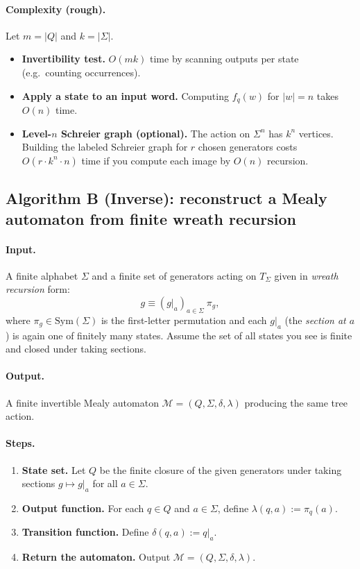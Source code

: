 \documentclass[11pt]{article}
\theoremstyle{definition}
\theoremstyle{plain}
\theoremstyle{remark}
\begin{document}
\paragraph{Complexity (rough).}
Let $m=|Q|$ and $k=|\Sigma|$.
\begin{itemize}[leftmargin=2em]
\item \textbf{Invertibility test.} $O(mk)$ time by scanning outputs per state (e.g.\ counting occurrences).
\item \textbf{Apply a state to an input word.} Computing $f_q(w)$ for $|w|=n$ takes $O(n)$ time.
\item \textbf{Level-$n$ Schreier graph (optional).} The action on $\Sigma^n$ has $k^n$ vertices.
Building the labeled Schreier graph for $r$ chosen generators costs $O(r\cdot k^n \cdot n)$ time if you compute each image by $O(n)$ recursion.
\end{itemize}

\subsection*{Algorithm B (Inverse): reconstruct a Mealy automaton from finite wreath recursion}
\paragraph{Input.}
A finite alphabet $\Sigma$ and a finite set of generators acting on $T_\Sigma$ given in \emph{wreath recursion} form:
\[
g \equiv (g|_a)_{a\in\Sigma}\ \pi_g,
\]
where $\pi_g\in\mathrm{Sym}(\Sigma)$ is the first-letter permutation and each $g|_a$ (the \emph{section at $a$}) is again one of finitely many states.
Assume the set of all states you see is finite and closed under taking sections.

\paragraph{Output.}
A finite invertible Mealy automaton $\mathcal M=(Q,\Sigma,\delta,\lambda)$ producing the same tree action.

\paragraph{Steps.}
\begin{enumerate}[leftmargin=2.2em]
\item \textbf{State set.} Let $Q$ be the finite closure of the given generators under taking sections $g\mapsto g|_a$ for all $a\in\Sigma$.
\item \textbf{Output function.} For each $q\in Q$ and $a\in\Sigma$, define $\lambda(q,a):=\pi_q(a)$.
\item \textbf{Transition function.} Define $\delta(q,a):=q|_a$.
\item \textbf{Return the automaton.} Output $\mathcal M=(Q,\Sigma,\delta,\lambda)$.
\end{enumerate}
\end{document}
